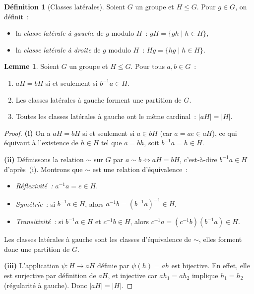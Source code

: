 \documentclass[12pt,a4paper,openany]{book}
\theoremstyle{definition}
\newtheorem{definition}{Définition}[chapter]
\newtheorem{lemme}{Lemme}[chapter]
\newcommand{\abs}[1]{\lvert #1 \rvert}
\begin{document}
\begin{definition}[Classes latérales]
\label{def:classes-laterales}
Soient $G$ un groupe et $H \leq G$. Pour $g \in G$, on définit~:
\begin{itemize}
  \item la \emph{classe latérale à gauche} de $g$ modulo $H$~: $gH = \{gh \mid h \in
    H\}$,
  \item la \emph{classe latérale à droite} de $g$ modulo $H$~: $Hg = \{hg \mid h \in
    H\}$.
\end{itemize}
\end{definition}

\begin{lemme}
\label{lem:classes-laterales}
Soient $G$ un groupe et $H \leq G$. Pour tous $a, b \in G$~:
\begin{enumerate}[label=(\roman*)]
  \item $aH = bH$ si et seulement si $b^{-1}a \in H$.
  \item Les classes latérales à gauche forment une partition de $G$.
  \item Toutes les classes latérales à gauche ont le même cardinal~: $\abs{aH} =
    \abs{H}$.
\end{enumerate}
\end{lemme}

\begin{proof}
\textbf{(i)} On a $aH = bH$ si et seulement si $a \in bH$ (car $a = ae \in aH$), ce
qui équivaut à l'existence de $h \in H$ tel que $a = bh$, soit $b^{-1}a = h \in H$.

\textbf{(ii)} Définissons la relation $\sim$ sur $G$ par $a \sim b \Leftrightarrow aH =
bH$, c'est-à-dire $b^{-1}a \in H$ d'après~(i). Montrons que $\sim$ est une relation
d'équivalence~:
\begin{itemize}
  \item \emph{Réflexivité~:} $a^{-1}a = e \in H$.
  \item \emph{Symétrie~:} si $b^{-1}a \in H$, alors $a^{-1}b = (b^{-1}a)^{-1} \in H$.
  \item \emph{Transitivité~:} si $b^{-1}a \in H$ et $c^{-1}b \in H$, alors $c^{-1}a =
    (c^{-1}b)(b^{-1}a) \in H$.
\end{itemize}
Les classes latérales à gauche sont les classes d'équivalence de $\sim$, elles forment
donc une partition de $G$.

\textbf{(iii)} L'application $\psi : H \to aH$ définie par $\psi(h) = ah$ est bijective.
En effet, elle est surjective par définition de $aH$, et injective car $ah_1 = ah_2$
implique $h_1 = h_2$ (régularité à gauche). Donc $\abs{aH} = \abs{H}$.
\end{proof}
\end{document}
